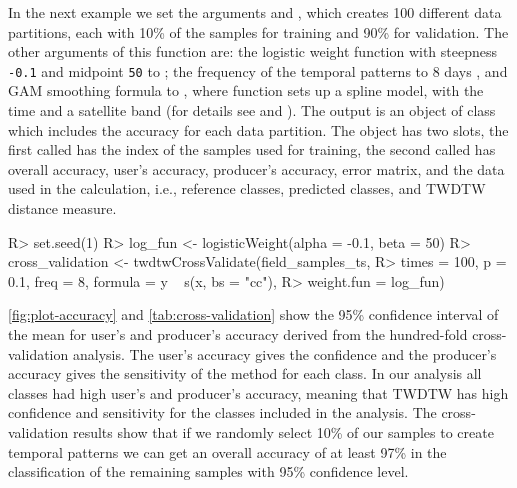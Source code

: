 \documentclass[article,shortnames]{jss}
\begin{document}
In the next example we set the arguments  and
, which creates 100 different data partitions, each with
10\% of the samples for training and 90\% for validation. The other
arguments of this function are: the logistic weight function with
steepness \texttt{-0.1} and midpoint \texttt{50} to ;
the frequency of the temporal patterns to 8 days , and
GAM smoothing formula to , where function
 sets up a spline model, with  the time and  a
satellite band (for details see  and ).
The output is an object of class  which
includes the accuracy for each data partition. The object has two slots,
the first called  has the index of the samples used for
training, the second called  has overall accuracy, user's
accuracy, producer's accuracy, error matrix, and the data used in the
calculation, i.e., reference classes, predicted classes, and TWDTW
distance measure.

\begin{CodeChunk}

\begin{CodeInput}
R> set.seed(1)
R> log_fun <- logisticWeight(alpha = -0.1, beta = 50) 
R> cross_validation <- twdtwCrossValidate(field_samples_ts, 
R>   times = 100, p = 0.1, freq = 8, formula = y ~ s(x, bs = "cc"), 
R>   weight.fun = log_fun)
\end{CodeInput}
\end{CodeChunk}

\autoref{fig:plot-accuracy} and \autoref{tab:cross-validation} show the
95\% confidence interval of the mean for user's and producer's accuracy
derived from the hundred-fold cross-validation analysis. The user's
accuracy gives the confidence and the producer's accuracy gives the
sensitivity of the method for each class. In our analysis all classes
had high user's and producer's accuracy, meaning that TWDTW has high
confidence and sensitivity for the classes included in the analysis. The
cross-validation results show that if we randomly select 10\% of our
samples to create temporal patterns we can get an overall accuracy of at
least 97\% in the classification of the remaining samples with 95\%
confidence level.
\end{document}
